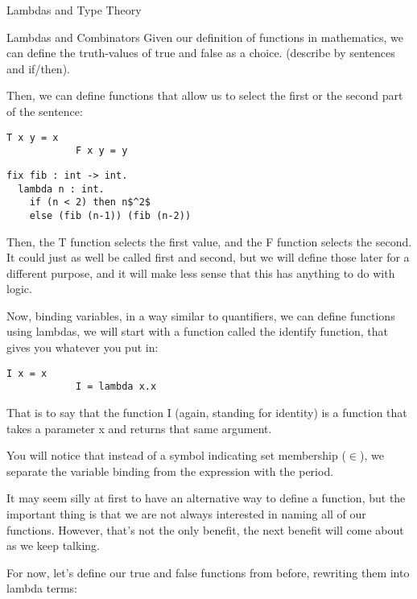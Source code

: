 \begin{part}{Lambdas and Type Theory}
    \begin{chapter}{Lambdas and Combinators}
        Given our definition of functions in mathematics, we can define the truth-values of true and false as a choice. (describe by sentences and if/then).
        
        Then, we can define functions that allow us to select the first or the second part of the sentence:
        
        \begin{lstlisting}[language=Lambda]
            T x y = x
            F x y = y
        \end{lstlisting}
        
        \begin{lstlisting}[language=Lambda]
fix fib : int -> int.
  lambda n : int.
    if (n < 2) then n$^2$
    else (fib (n-1)) (fib (n-2))
\end{lstlisting}
        
        Then, the T function selects the first value, and the F function selects the second. It could just as well be called first and second, but we will define those later for a different purpose, and it will make less sense that this has anything to do with logic.
        
        Now, binding variables, in a way similar to quantifiers, we can define functions using lambdas, we will start with a function called the identify function, that gives you whatever you put in:
        
        \begin{lstlisting}[language=Lambda]
            I x = x
            I = lambda x.x
        \end{lstlisting}
        
        That is to say that the function I (again, standing for identity) is a function that takes a parameter x and returns that same argument.
        
        You will notice that instead of a symbol indicating set membership ($\in$), we separate the variable binding from the expression with the period.
        
        It may seem silly at first to have an alternative way to define a function, but the important thing is that we are not always interested in naming all of our functions. However, that's not the only benefit, the next benefit will come about as we keep talking.
        
        For now, let's define our true and false functions from before, rewriting them into lambda terms:
        

\end{chapter}
\end{part}

